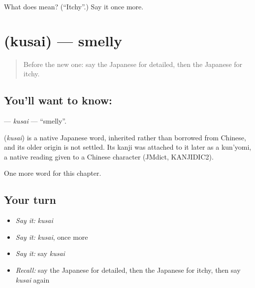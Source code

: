 \begin{tcolorbox}[breakable,colback=teal!4,colframe=teal!35!black,title={Before you move on}]
What does  mean? (\textquotedblleft{}Itchy\textquotedblright{}.) Say it once more.
\end{tcolorbox}
\section[\texorpdfstring{\ja{くさい} (kusai)}{くさい (kusai)}]{ (kusai) — smelly}

\label{lesson:JA-C124-kusai}



\begin{quote}
Before the new one: say the Japanese for detailed, then the Japanese for itchy.
\end{quote}

\subsection*{You'll want to know: }
\textbf{} — \emph{kusai} — \textquotedblleft{}smelly\textquotedblright{}.

\begin{cousinweb}
\textbf{} (\emph{kusai}) is a native Japanese word, inherited rather than borrowed from Chinese, and its older origin is not settled. Its kanji was attached to it later as a kun'yomi, a native reading given to a Chinese character (JMdict, KANJIDIC2).
\end{cousinweb}

\begin{grammarlens}[title={What you've built}]
One more word for this chapter.
\end{grammarlens}

\subsection*{Your turn}
\begin{itemize}
\raggedright
  \item \emph{Say it:} \emph{kusai}
  \item \emph{Say it:} \emph{kusai}, once more
  \item \emph{Say it:} say \emph{kusai}
  \item \emph{Recall:} say the Japanese for detailed, then the Japanese for itchy, then say \emph{kusai} again
\end{itemize}


